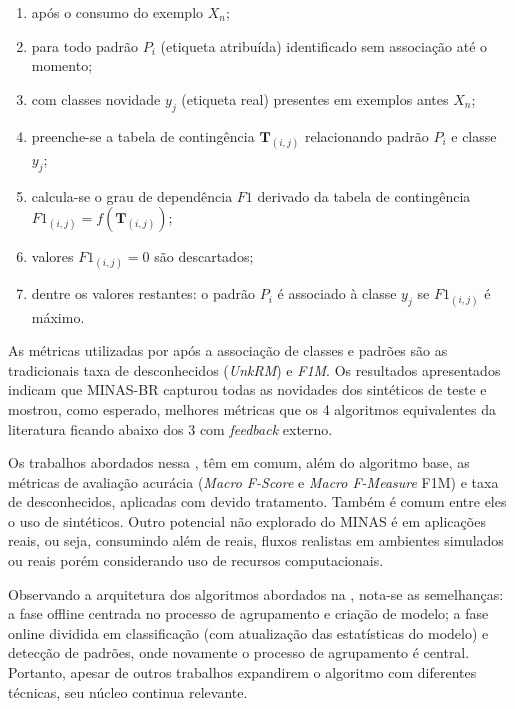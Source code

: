 \begin{enumerate}

    \item após o consumo do exemplo $X_n$;
    
    \item para todo padrão $P_i$ (etiqueta atribuída) identificado sem
    associação até o momento;
    
    \item com classes novidade $y_j$ (etiqueta real) presentes em exemplos antes
    $X_n$;
    
    \item preenche-se a tabela de contingência $\mathbf{T}_{(i,j)}$ relacionando
    padrão $P_i$ e classe $y_j$;
    
    \item calcula-se o grau de dependência $\mathit{F1}$ derivado da tabela de
    contingência $\mathit{F1}_{(i,j)} = f(\mathbf{T}_{(i,j)})$;
    
    \item valores $\mathit{F1}_{(i,j)} = 0$ são descartados;
    
    \item dentre os valores restantes: o padrão $P_i$ é associado à classe $y_j$
    se $\mathit{F1}_{(i,j)}$ é máximo.

\end{enumerate}

As métricas utilizadas por  após a associação de classes e
padrões são as tradicionais taxa de desconhecidos (\emph{UnkRM}) e \emph{F1M}.
Os resultados apresentados indicam que MINAS-BR capturou todas as novidades dos
\datasets sintéticos de teste e mostrou, como esperado, melhores métricas que os
4 algoritmos equivalentes da literatura ficando abaixo dos 3 com \emph{feedback}
externo.

Os trabalhos abordados nessa , têm em
comum, além do algoritmo base, as métricas de avaliação acurácia (\emph{Macro F-Score} e \emph{Macro
F-Measure} F1M) e taxa de desconhecidos, aplicadas com devido tratamento.
Também é comum entre eles o uso de \datasets sintéticos.
Outro potencial não explorado do MINAS é em aplicações reais, ou seja,
consumindo além de \datasets reais, fluxos realistas em ambientes simulados ou
reais porém considerando uso de recursos computacionais.

Observando a arquitetura dos algoritmos abordados na , nota-se as semelhanças:
a fase offline centrada no processo de agrupamento e criação de modelo;
a fase online dividida em classificação (com atualização das estatísticas do modelo)
e detecção de padrões, onde novamente o processo de agrupamento é central.
Portanto, apesar de outros trabalhos expandirem o algoritmo com diferentes técnicas, seu
núcleo continua relevante.

